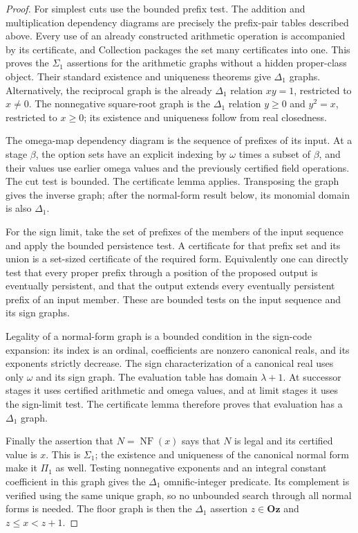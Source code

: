 \documentclass[11pt,a4paper]{article}
\numberwithin{equation}{section}
\theoremstyle{definition}
\theoremstyle{remark}
\newcommand{\Oz}{\mathbf{Oz}}
\begin{document}
\begin{proof}
For simplest cuts use the bounded prefix test.  The addition and
multiplication dependency diagrams are precisely the prefix-pair
tables described above.  Every use of an already constructed
arithmetic operation is accompanied by its certificate, and
Collection packages the set many certificates into one.  This proves
the $\Sigma_1$ assertions for the arithmetic graphs without a hidden
proper-class object.  Their standard existence and uniqueness
theorems give $\Delta_1$ graphs.  Alternatively, the reciprocal graph
is the already $\Delta_1$ relation $xy=1$, restricted to $x\ne0$.
The nonnegative square-root graph is the $\Delta_1$ relation
$y\geq0$ and $y^2=x$, restricted to $x\geq0$; its existence and
uniqueness follow from real closedness.

The omega-map dependency diagram is the sequence of prefixes of its
input.  At a stage $\beta$, the option sets have an explicit indexing
by $\omega$ times a subset of $\beta$, and their values use earlier
omega values and the previously certified field operations.  The
cut test is bounded.  The certificate lemma applies.  Transposing the
graph gives the inverse graph; after the normal-form result below,
its monomial domain is also $\Delta_1$.

For the sign limit, take the set of prefixes of the members of the
input sequence and apply the bounded persistence test.  A certificate
for that prefix set and its union is a set-sized certificate of the
required form.  Equivalently one can directly test that every proper
prefix through a position of the proposed output is eventually
persistent, and that the output extends every eventually persistent
prefix of an input member.  These are bounded tests on the input
sequence and its sign graphs.

Legality of a normal-form graph is a bounded condition in the sign-code
expansion: its index is an ordinal, coefficients are nonzero canonical
reals, and its exponents strictly decrease.  The sign characterization
of a canonical real uses only $\omega$ and its sign graph.  The
evaluation table has domain $\lambda+1$.  At successor stages it
uses certified arithmetic and omega values, and at limit stages it
uses the sign-limit test.  The certificate lemma therefore proves
that evaluation has a $\Delta_1$ graph.

Finally the assertion that $N=\operatorname{NF}(x)$ says that $N$ is
legal and its certified value is $x$.  This is $\Sigma_1$; the
existence and uniqueness of the canonical normal form make it
$\Pi_1$ as well.  Testing nonnegative exponents and an integral
constant coefficient in this graph gives the $\Delta_1$
omnific-integer predicate.  Its complement is verified using the
same unique graph, so no unbounded search through all normal forms
is needed.  The floor graph is then the $\Delta_1$ assertion
$z\in\Oz$ and $z\leq x<z+1$.
\end{proof}
\end{document}
